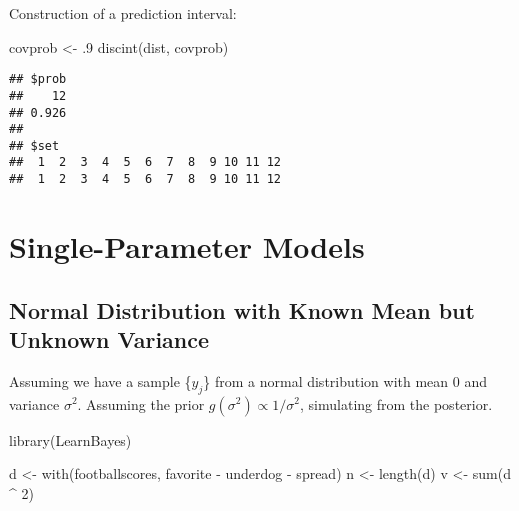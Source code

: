 \documentclass[
]{book}
\newenvironment{Shaded}{\begin{snugshade}}{\end{snugshade}}
\newcommand{\DecValTok}[1]{\textcolor[rgb]{0.00,0.00,0.81}{#1}}
\newcommand{\FunctionTok}[1]{\textcolor[rgb]{0.00,0.00,0.00}{#1}}
\newcommand{\NormalTok}[1]{#1}
\newcommand{\OtherTok}[1]{\textcolor[rgb]{0.56,0.35,0.01}{#1}}
\newcommand{\SpecialCharTok}[1]{\textcolor[rgb]{0.00,0.00,0.00}{#1}}
\begin{document}
Construction of a prediction interval:

\begin{Shaded}
\begin{Highlighting}[]
\NormalTok{covprob }\OtherTok{\textless{}{-}}\NormalTok{ .}\DecValTok{9}
\FunctionTok{discint}\NormalTok{(dist, covprob)}
\end{Highlighting}
\end{Shaded}

\begin{verbatim}
## $prob
##    12 
## 0.926 
## 
## $set
##  1  2  3  4  5  6  7  8  9 10 11 12 
##  1  2  3  4  5  6  7  8  9 10 11 12
\end{verbatim}

\hypertarget{single-parameter-models}{%
\chapter{Single-Parameter Models}\label{single-parameter-models}}

\hypertarget{normal-distribution-with-known-mean-but-unknown-variance}{%
\section{Normal Distribution with Known Mean but Unknown Variance}\label{normal-distribution-with-known-mean-but-unknown-variance}}

Assuming we have a sample \{\(y_j\)\} from a normal distribution with mean 0 and variance \(\sigma^2\). Assuming the prior \(g(\sigma^2) \propto 1/\sigma^2\), simulating from the posterior.

\begin{Shaded}
\begin{Highlighting}[]
\FunctionTok{library}\NormalTok{(LearnBayes)}
\end{Highlighting}
\end{Shaded}

\begin{Shaded}
\begin{Highlighting}[]
\NormalTok{d }\OtherTok{\textless{}{-}} \FunctionTok{with}\NormalTok{(footballscores,}
\NormalTok{          favorite }\SpecialCharTok{{-}}\NormalTok{ underdog }\SpecialCharTok{{-}}\NormalTok{ spread)}
\NormalTok{n }\OtherTok{\textless{}{-}} \FunctionTok{length}\NormalTok{(d)}
\NormalTok{v }\OtherTok{\textless{}{-}} \FunctionTok{sum}\NormalTok{(d }\SpecialCharTok{\^{}} \DecValTok{2}\NormalTok{)}
\end{Highlighting}
\end{Shaded}
\end{document}
